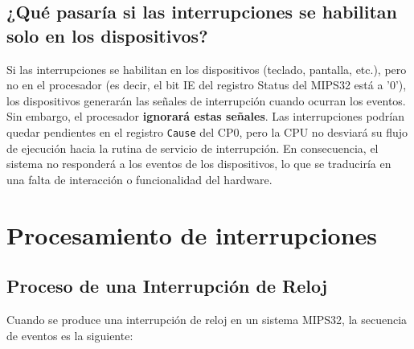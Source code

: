\documentclass[12pt,a4paper]{article}
\begin{document}
	\subsection{¿Qué pasaría si las interrupciones se habilitan solo en los dispositivos?}
	Si las interrupciones se habilitan en los dispositivos (teclado, pantalla, etc.), pero no en el procesador (es decir, el bit IE del registro Status del MIPS32 está a '0'), los dispositivos generarán las señales de interrupción cuando ocurran los eventos. Sin embargo, el procesador \textbf{ignorará estas señales}. Las interrupciones podrían quedar pendientes en el registro \texttt{Cause} del CP0, pero la CPU no desviará su flujo de ejecución hacia la rutina de servicio de interrupción. En consecuencia, el sistema no responderá a los eventos de los dispositivos, lo que se traduciría en una falta de interacción o funcionalidad del hardware.
	
	
	\section{Procesamiento de interrupciones}
	
	\subsection{Proceso de una Interrupción de Reloj}
	Cuando se produce una interrupción de reloj en un sistema MIPS32, la secuencia de eventos es la siguiente:
	
\end{document}
